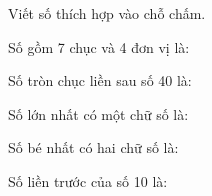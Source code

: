 \documentclass[../main.tex]{subfiles}
\begin{document}
\OTcho{4.5cm}\begin{bt}
    Viết số thích hợp vào chỗ chấm.
    \begin{listEX}
        \item Số gồm 7 chục và 4 đơn vị là: \OTcham[2.2cm]
        \item Số tròn chục liền sau số 40 là: \OTcham[2.2cm]
        \item Số lớn nhất có một chữ số là: \OTcham[2.2cm]
        \item Số bé nhất có hai chữ số là: \OTcham[2.2cm]
        \item Số liền trước của số 10 là: \OTcham[2.2cm]
    \end{listEX}
\end{bt}

\end{document}
